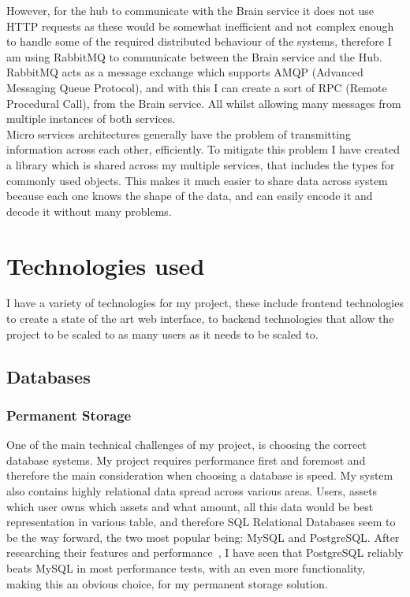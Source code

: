 \documentclass[titlepage]{article}
\begin{document}
However, for the hub to communicate with the Brain service it does not use HTTP requests as these would be somewhat inefficient and not complex enough to handle some of the required distributed behaviour of the systems, therefore I am using RabbitMQ to communicate between the Brain service and the Hub. RabbitMQ acts as a message exchange which supports AMQP (Advanced Messaging Queue Protocol), and with this I can create a sort of RPC (Remote Procedural Call), from the Brain service. All whilst allowing many messages from multiple instances of both services. \\

Micro services architectures generally have the problem of transmitting information across each other, efficiently. To mitigate this problem I have created a library which is shared across my multiple services, that includes the types for commonly used objects. This makes it much easier to share data across system because each one knows the shape of the data, and can easily encode it and decode it without many problems.

\pagebreak
\section{Technologies used}
I have a variety of technologies for my project, these include frontend technologies to create a state of the art web interface, to backend technologies that allow the project to be scaled to as many users as it needs to be scaled to. \\

\subsection{Databases}

\subsubsection{Permanent Storage}
One of the main technical challenges of my project, is choosing the correct database systems. My project requires performance first and foremost and therefore the main consideration when choosing a database is speed. My system also contains highly relational data spread across various areas. Users, assets which user owns which assets and what amount, all this data would be best representation in various table, and therefore SQL Relational Databases seem to be the way forward, the two most popular being: MySQL and PostgreSQL. After researching their features and performance~\cite{postgres_vs_mysql}, I have seen that PostgreSQL reliably beats MySQL in most performance tests, with an even more functionality, making this an obvious choice, for my permanent storage solution. \\
\end{document}
